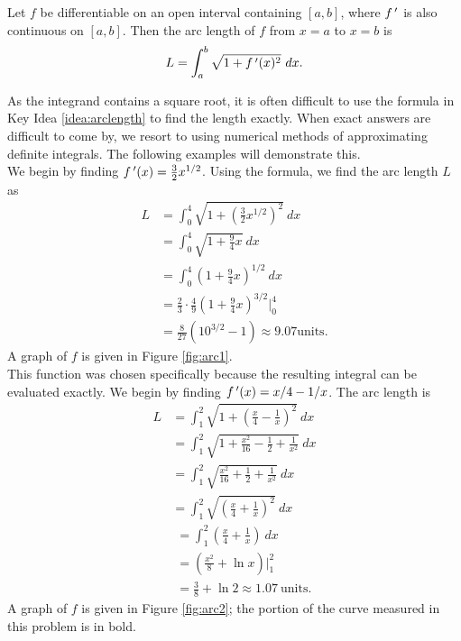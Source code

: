 {Let $f$ be differentiable on an open interval containing $[a,b]$, where $f\,'$ is also continuous on $[a,b]$. Then the arc length of $f$ from $x=a$ to $x=b$ is
$$L = \int_a^b \sqrt{1+\fp(x)^2}\ dx.$$
}

As the integrand contains a square root, it is often difficult to use the formula in Key Idea \ref{idea:arclength} to find the length exactly. When exact answers are difficult to come by, we resort to using numerical methods of approximating definite integrals. The following examples will demonstrate this.\\

{We begin by finding $f\,'(x)= \frac32x^{1/2}$. Using the formula, we find the arc length $L$ as
\begin{align*}
	L &=	\int_0^4 \sqrt{1+\left(\frac32x^{1/2}\right)^2}\ dx \\
		&=	\int_0^4 \sqrt{1+\frac94x} \ dx \\
		&= 	\int_0^4 \left(1+\frac94x\right)^{1/2}\ dx \\
		&=  \frac23\cdot \frac49\left(1+\frac94x\right)^{3/2}\Big|_0^4 \\
		&=\frac{8}{27}\left(10^{3/2}-1\right) \approx 9.07 \text{units}.
\end{align*}
	A graph of $f$ is given in Figure \ref{fig:arc1}. 
}\\

{This function was chosen specifically because the resulting integral can be evaluated exactly. We begin by finding $f\,'(x) = x/4-1/x$. The arc length is 
\begin{align*}
L		&=  \int_1^2 \sqrt{1+ \left(\frac x4-\frac1x\right)^2}\ dx \\
		&= 	\int_1^2 \sqrt{1 + \frac{x^2}{16} -\frac12 + \frac1{x^2} } \ dx \\
		&=	\int_1^2 \sqrt{\frac{x^2}{16} +\frac12 + \frac1{x^2} } \ dx \\
		&=	\int_1^2	\sqrt{ \left(\frac x4 + \frac1x\right)^2}\ dx 
\end{align*}
\begin{align*}
\phantom{L}
				&= \int_1^2 \left(\frac x4 + \frac1x\right) \ dx \\
		&=  \left(\frac{x^2}8 + \ln x\right)\Bigg|_1^2\\
		&=	\frac38+\ln 2 \approx 1.07 \ \text{units}.
\end{align*}
A graph of $f$ is given in Figure \ref{fig:arc2}; the portion of the curve measured in this problem is in bold.
}\\

